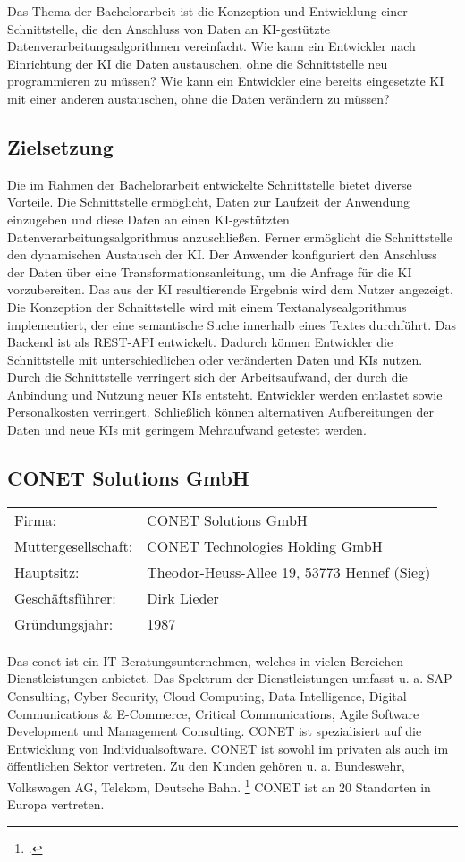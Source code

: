 Das Thema der Bachelorarbeit ist die Konzeption und Entwicklung einer Schnittstelle, die den Anschluss von Daten an KI-gestützte Datenverarbeitungsalgorithmen vereinfacht. Wie kann ein Entwickler nach Einrichtung der KI die Daten austauschen, ohne die Schnittstelle neu programmieren zu müssen? Wie kann ein Entwickler eine bereits eingesetzte KI mit einer anderen austauschen, ohne die Daten verändern zu müssen?

\subsection{Zielsetzung}
Die im Rahmen der Bachelorarbeit entwickelte Schnittstelle bietet diverse Vorteile. Die Schnittstelle ermöglicht, Daten zur Laufzeit der Anwendung einzugeben und diese Daten an einen KI-gestützten Datenverarbeitungsalgorithmus anzuschließen. Ferner ermöglicht die Schnittstelle den dynamischen Austausch der KI. Der Anwender konfiguriert den Anschluss der Daten über eine Transformationsanleitung, um die Anfrage für die KI vorzubereiten. Das aus der KI resultierende Ergebnis wird dem Nutzer angezeigt. Die Konzeption der Schnittstelle wird mit einem Textanalysealgorithmus implementiert, der eine semantische Suche innerhalb eines Textes durchführt. Das Backend ist als REST-API entwickelt. Dadurch können Entwickler die Schnittstelle mit unterschiedlichen oder veränderten Daten und KIs nutzen. Durch die Schnittstelle verringert sich der Arbeitsaufwand, der durch die Anbindung und Nutzung neuer KIs entsteht. Entwickler werden entlastet sowie Personalkosten verringert. 
Schließlich können alternativen Aufbereitungen der Daten und neue KIs mit geringem Mehraufwand getestet werden.

\subsection{CONET Solutions GmbH}
\begin{table}[H]
\begin{tabular}{ l l }
Firma: & CONET Solutions GmbH \\
Muttergesellschaft: & CONET Technologies Holding GmbH \\
Hauptsitz: & Theodor-Heuss-Allee 19, 53773 Hennef (Sieg) \\
Geschäftsführer: & Dirk Lieder \\
Gründungsjahr: & 1987 
\end{tabular}
\end{table}

Das \ac{conet} ist ein IT-Beratungsunternehmen, welches in vielen Bereichen Dienstleistungen anbietet. Das Spektrum der Dienstleistungen umfasst u. a. SAP Consulting, Cyber Security, Cloud Computing, Data Intelligence, Digital Communications \& E-Commerce, Critical Communications, Agile Software Development und Management Consulting. CONET ist spezialisiert auf die Entwicklung von Individualsoftware. CONET ist sowohl im privaten als auch im öffentlichen Sektor vertreten. Zu den Kunden gehören u. a. Bundeswehr, Volkswagen AG, Telekom, Deutsche Bahn. \footcite [Auszug aus der Kundenliste]{Kunden} CONET ist an 20 Standorten in Europa vertreten.

